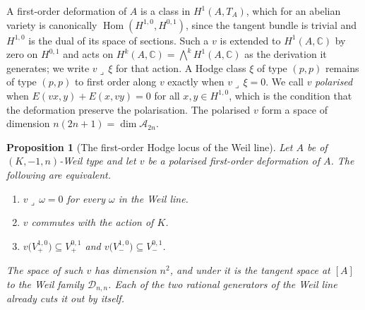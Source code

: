 \documentclass[11pt,reqno]{amsart}
\theoremstyle{plain}
\newtheorem{proposition}[theorem]{Proposition}
\theoremstyle{definition}
\theoremstyle{remark}
\newcommand{\CC}{\mathbb{C}}
\newcommand{\cA}{\mathcal{A}}
\newcommand{\cD}{\mathcal{D}}
\DeclareMathOperator{\Hom}{Hom}
\begin{document}
A first-order deformation of $A$ is a class in $H^{1}(A,T_{A})$, which for an
abelian variety is canonically $\Hom(H^{1,0},H^{0,1})$, since the tangent
bundle is trivial and $H^{1,0}$ is the dual of its space of sections. Such a
$v$ is extended to $H^{1}(A,\CC)$ by zero on $H^{0,1}$ and acts on
$H^{k}(A,\CC)=\bigwedge^{k}H^{1}(A,\CC)$ as the derivation it generates; we
write $v\lrcorner\,\xi$ for that action. A Hodge class $\xi$ of type $(p,p)$
remains of type $(p,p)$ to first order along $v$ exactly when
$v\lrcorner\,\xi=0$. We call $v$ \emph{polarised} when
$E(vx,y)+E(x,vy)=0$ for all $x,y\in H^{1,0}$, which is the condition that the
deformation preserve the polarisation. The polarised $v$ form a space of
dimension $n(2n+1)=\dim\cA_{2n}$.

\begin{proposition}[The first-order Hodge locus of the Weil line]
\label{prop:firstorder}
Let $A$ be of $(K,-1,n)$-Weil type and let $v$ be a polarised first-order
deformation of $A$. The following are equivalent.
\begin{enumerate}[label=\textup{(\roman*)},nosep]
\item $v\lrcorner\,\omega=0$ for every $\omega$ in the Weil line.
\item $v$ commutes with the action of $K$.
\item $v\bigl(V_{+}^{1,0}\bigr)\subseteq V_{+}^{0,1}$ and
  $v\bigl(V_{-}^{1,0}\bigr)\subseteq V_{-}^{0,1}$.
\end{enumerate}
The space of such $v$ has dimension $n^{2}$, and under
 it is the tangent space at $[A]$ to the Weil family
$\cD_{n,n}$. Each of the two rational generators of the Weil line already
cuts it out by itself.
\end{proposition}
\end{document}
